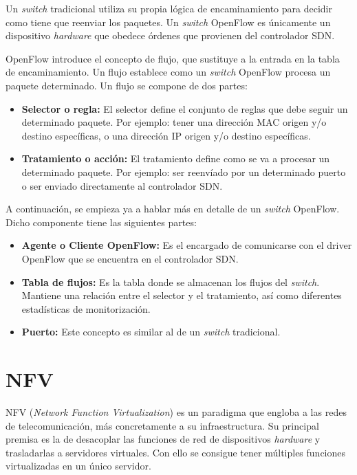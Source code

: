 Un \textit{switch} tradicional utiliza su propia lógica de encaminamiento para decidir como tiene que reenviar los paquetes. Un \textit{switch} OpenFlow es únicamente un dispositivo \textit{hardware} que obedece órdenes que provienen del controlador SDN.

OpenFlow introduce el concepto de flujo, que sustituye a la entrada en la tabla de encaminamiento. Un flujo establece como un \textit{switch} OpenFlow procesa un paquete determinado. Un flujo se compone de dos partes:

\begin{itemize}
	\item \textbf{Selector o regla:} El selector define el conjunto de reglas que debe seguir un determinado paquete. Por ejemplo: tener una dirección MAC origen y/o destino específicas, o una dirección IP origen y/o destino específicas. 
	
	\item \textbf{Tratamiento o acción:} El tratamiento define como se va a procesar un determinado paquete. Por ejemplo: ser reenvíado por un determinado puerto o ser enviado directamente al controlador SDN.
\end{itemize}
	
A continuación, se empieza ya a hablar más en detalle de un \textit{switch} OpenFlow. Dicho componente tiene las siguientes partes:

\begin{itemize}
	\item \textbf{Agente o Cliente OpenFlow:} Es el encargado de comunicarse con el driver OpenFlow que se encuentra en el controlador SDN.
	
	\item \textbf{Tabla de flujos:} Es la tabla donde se almacenan los flujos del \textit{switch}. Mantiene una relación entre el selector y el tratamiento, así como diferentes estadísticas de monitorización.
	
	\item \textbf{Puerto:} Este concepto es similar al de un \textit{switch} tradicional.
\end{itemize}

\section{NFV}
\label{sec:nfv}

NFV (\textit{Network Function Virtualization})\cite{nfvbib} es un paradigma que engloba a las redes de telecomunicación, más concretamente a su infraestructura. Su principal premisa es la de desacoplar las funciones de red de dispositivos \textit{hardware} y trasladarlas a servidores virtuales. Con ello se consigue tener múltiples funciones virtualizadas en un único servidor.


